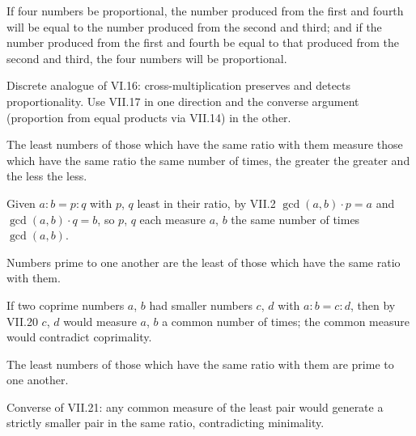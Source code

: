 \documentclass{rrxiv}
\begin{document}
\begin{claim}
\label{prop:VII.19}
If four numbers be proportional, the number produced from the first
and fourth will be equal to the number produced from the second and
third; and if the number produced from the first and fourth be equal
to that produced from the second and third, the four numbers will be
proportional.
\end{claim}
\begin{evidence}
\label{ev:VII.19}
Discrete analogue of VI.16: cross-multiplication preserves and
detects proportionality.  Use VII.17 in one direction and the
converse argument (proportion from equal products via VII.14) in the
other.
\end{evidence}

\begin{claim}
\label{prop:VII.20}
The least numbers of those which have the same ratio with them
measure those which have the same ratio the same number of times,
the greater the greater and the less the less.
\end{claim}
\begin{evidence}
\label{ev:VII.20}
Given $a : b = p : q$ with $p$, $q$ least in their ratio, by VII.2
$\gcd(a, b) \cdot p = a$ and $\gcd(a, b) \cdot q = b$, so $p$, $q$
each measure $a$, $b$ the same number of times $\gcd(a, b)$.
\end{evidence}

\begin{claim}
\label{prop:VII.21}
Numbers prime to one another are the least of those which have the
same ratio with them.
\end{claim}
\begin{evidence}
\label{ev:VII.21}
If two coprime numbers $a$, $b$ had smaller numbers $c$, $d$ with
$a : b = c : d$, then by VII.20 $c$, $d$ would measure $a$, $b$ a
common number of times; the common measure would contradict
coprimality.
\end{evidence}

\begin{claim}
\label{prop:VII.22}
The least numbers of those which have the same ratio with them are
prime to one another.
\end{claim}
\begin{evidence}
\label{ev:VII.22}
Converse of VII.21: any common measure of the least pair would
generate a strictly smaller pair in the same ratio, contradicting
minimality.
\end{evidence}
\end{document}
